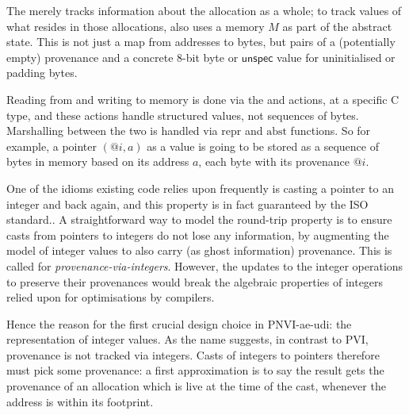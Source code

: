 The  merely tracks information about the allocation as a
whole; to track values of what resides in those allocations, 
also uses a memory $M$ as part of the abstract state. This is not just a map
from addresses to bytes, but pairs of a (potentially empty) provenance and a
concrete 8-bit byte or $\mathsf{unspec}$ value for uninitialised or padding
bytes.\label{sn:ignore-ptr-index}

Reading from and writing to memory is done via the  and
 actions, at a specific C type, and these actions handle
structured  values, not sequences of bytes. Marshalling between the
two is handled via $\mathrm{repr}$ and $\mathrm{abst}$ functions. So for
example, a pointer $(@i, a)$ as a value is going to be stored as a sequence of
bytes in memory based on its address $a$, each byte with its provenance
$@i$.

One of the idioms existing code relies upon frequently is casting a pointer to
an integer and back again, and this  property is in fact
guaranteed by the ISO standard.. A
straightforward way to model the round-trip property is to ensure casts from
pointers to integers do not lose any information, by augmenting the model of
integer values to also carry (as ghost information) provenance. This is called
 for \emph{provenance-via-integers}. However, the updates to the
integer operations to preserve their provenances would break the algebraic
properties of integers relied upon for optimisations by compilers.

Hence the reason for the first crucial design choice in PNVI-ae-udi: the
representation of integer values. As the name suggests, in contrast to PVI,
provenance is not tracked via integers. Casts of integers to pointers therefore
must pick some provenance: a first approximation is to say the result gets the
provenance of an allocation which is live at the time of the cast, whenever the
address is within its footprint.

